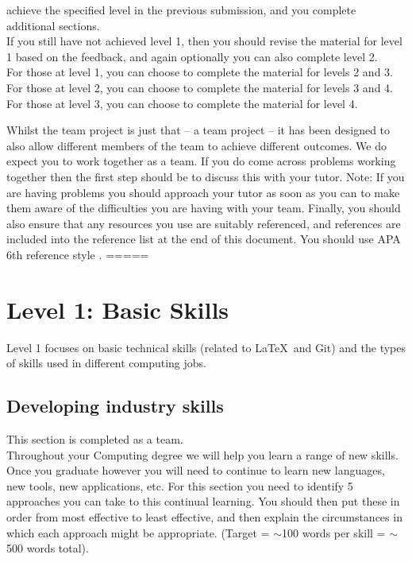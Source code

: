 \documentclass[a4paper, 11pt]{report}
\begin{document}
\begin{itemize}
		achieve the specified level in the previous submission, and you complete additional
		sections.\\
		If you still have not achieved level 1, then you should revise the material for
		level 1 based on the feedback, and again optionally you can also complete level 
		2.\\
		For those at level 1, you can choose to complete the material for levels 2 and 
		3.\\
		For those at level 2, you can choose to complete the material for levels 3 and 
		4.\\
		For those at level 3, you can choose to complete the material for level 4.
	\end{itemize}
	Whilst the team project is just that -- a team project -- it has been designed to 
	also allow different members of the team to achieve different outcomes. We do 
	expect you to work together as a team. If you do come across problems working 
	together then the first step should be to discuss this with your tutor. Note: If 
	you are having problems you should approach your tutor as soon as you can to make 
	them aware of the difficulties you are having with your team.
	Finally, you should also ensure that any resources you use are suitably referenced,
	and references are included into the reference list at the end of this document. 
	You should use APA 6th reference style \cite{apa6}.
	=====
	\newpage
	\section{Level 1: Basic Skills}
	Level 1 focuses on basic technical skills (related to \LaTeX\ and Git) and the 
	types of skills used in different computing jobs.
	\subsection{Developing industry skills}
	This section is completed as a team.\\
	Throughout your Computing degree we will help you learn a range of new skills. Once
	you graduate however you will need to continue to learn new languages, new tools, 
	new applications, etc. For this section you need to identify 5 approaches you can 
	take to this continual learning. You should then put these in order from most 
	effective to least effective, and then explain the circumstances in which each 
	approach might be appropriate. (Target = $\sim$100 words per skill = $\sim$500 
	words total).
\end{document}
